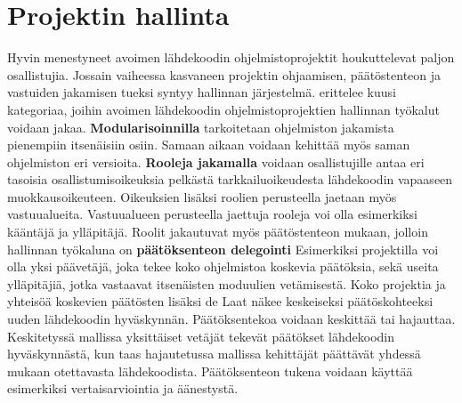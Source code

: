 \documentclass[utf8]{gradu3}
\begin{document}
\section{Projektin hallinta}
Hyvin menestyneet avoimen lähdekoodin ohjelmistoprojektit houkuttelevat paljon
osallistujia. Jossain vaiheessa kasvaneen projektin ohjaamisen, päätöstenteon ja
vastuiden jakamisen tueksi syntyy hallinnan järjestelmä. %
\textcite{Laat-2007} erittelee kuusi kategoriaa, joihin avoimen lähdekoodin
ohjelmistoprojektien hallinnan työkalut voidaan jakaa. %
\textbf{Modularisoinnilla} tarkoitetaan ohjelmiston jakamista pienempiin
itsenäisiin osiin. Samaan aikaan voidaan kehittää myös saman ohjelmiston eri
versioita.%
\textbf{Rooleja jakamalla} voidaan osallistujille antaa eri tasoisia
osallistumisoikeuksia pelkästä tarkkailuoikeudesta lähdekoodin vapaaseen
muokkausoikeuteen. Oikeuksien lisäksi roolien perusteella jaetaan myös
vastuualueita. Vastuualueen perusteella jaettuja rooleja voi olla esimerkiksi
kääntäjä ja ylläpitäjä.%
Roolit jakautuvat myös päätöstenteon mukaan, jolloin hallinnan työkaluna on
\textbf{päätöksenteon delegointi} Esimerkiksi projektilla voi olla yksi
päävetäjä, joka tekee koko ohjelmistoa koskevia päätöksia, sekä useita
ylläpitäjiä, jotka vastaavat itsenäisten moduulien vetämisestä. Koko projektia
ja yhteisöä koskevien päätösten lisäksi de Laat näkee keskeiseksi
päätöskohteeksi uuden lähdekoodin hyväskynnän. Päätöksentekoa voidaan keskittää
tai hajauttaa. Keskitetyssä mallissa yksittäiset vetäjät tekevät päätökset
lähdekoodin hyväskynnästä, kun taas hajautetussa mallissa kehittäjät päättävät
yhdessä mukaan otettavasta lähdekoodista. Päätöksenteon tukena voidaan käyttää
esimerkiksi vertaisarviointia ja äänestystä.%
\end{document}
